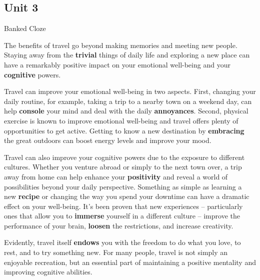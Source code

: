 \newpage

\subsection{Unit 3}

\begin{question}{Banked Cloze}

The benefits of travel go beyond making memories and meeting new people. Staying away from the \textbf{\color{red} trivial} things of daily life and exploring a new place can have a remarkably positive impact on your emotional well-being and your \textbf{\color{red} cognitive} powers.

\vspace{1em}

Travel can improve your emotional well-being in two aspects. First, changing your daily routine, for example, taking a trip to a nearby town on a weekend day, can help \textbf{\color{red} console} your mind and deal with the daily \textbf{\color{red} annoyances}. Second, physical exercise is known to improve emotional well-being and travel offers plenty of opportunities to get active. Getting to know a new destination by \textbf{\color{red} embracing} the great outdoors can boost energy levels and improve your mood.

\vspace{1em}

Travel can also improve your cognitive powers due to the exposure to different cultures. Whether you venture abroad or simply to the next town over, a trip away from home can help enhance your \textbf{\color{red} positivity} and reveal a world of possibilities beyond your daily perspective. Something as simple as learning a new \textbf{\color{red} recipe} or changing the way you spend your downtime can have a dramatic effect on your well-being. It's been proven that new experiences – particularly ones that allow you to \textbf{\color{red} immerse} yourself in a different culture – improve the performance of your brain, \textbf{\color{red} loosen} the restrictions, and increase creativity.

\vspace{1em}

Evidently, travel itself \textbf{\color{red} endows} you with the freedom to do what you love, to rest, and to try something new. For many people, travel is not simply an enjoyable recreation, but an essential part of maintaining a positive mentality and improving cognitive abilities.

\end{question}


